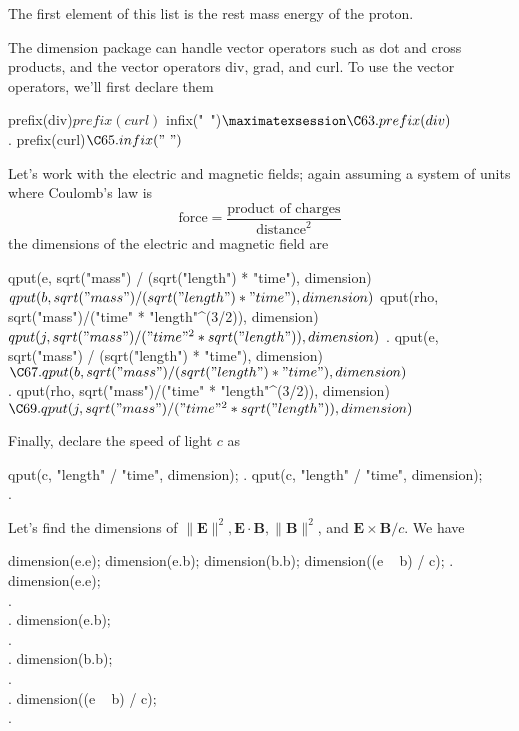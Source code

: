 \noindent The first element of this list is the rest mass energy of the 
proton.

The dimension package can handle vector operators such as
dot and cross products, and the vector operators div, grad, and curl.
To use the vector operators, we'll first declare them

\beginmaximasession
prefix(div)$
prefix(curl)$
infix("~")$
\maximatexsession
\C63.  prefix(div)$ \\
.  prefix(curl)$ \\
\C65.  infix("~")$ \\
\endmaximasession

\noindent Let's work with the electric and magnetic fields;
again assuming a system of units where Coulomb's law is
\[
  \mbox{force} = \frac{\mbox{product of charges}}{\mbox{distance}^2}
\]
the dimensions of the electric and magnetic field are

\beginmaximasession
qput(e, sqrt("mass") / (sqrt("length") * "time"), dimension)$
qput(b, sqrt("mass") / (sqrt("length") * "time"),dimension)$
qput(rho, sqrt("mass")/("time" * "length"^(3/2)), dimension)$
qput(j, sqrt("mass") / ("time"^2 * sqrt("length")), dimension)$
\maximatexsession
{}.  qput(e, sqrt("mass") / (sqrt("length") * "time"), dimension)$ \\
\C67.  qput(b, sqrt("mass") / (sqrt("length") * "time"),dimension)$ \\
.  qput(rho, sqrt("mass")/("time" * "length"^(3/2)), dimension)$ \\
\C69.  qput(j, sqrt("mass") / ("time"^2 * sqrt("length")), dimension)$ \\
\endmaximasession

Finally, declare the speed of light $c$ as

\beginmaximasession
qput(c, "length" / "time", dimension);
\maximatexsession
{}.  qput(c, "length" / "time", dimension); \\
.   \\
\endmaximasession

\noindent Let's find the dimensions of 
$\| \mathbf{E} \|^2, \mathbf{E} \cdot \mathbf{B},
\| \mathbf{B} \|^2$, and $\mathbf{E} \times \mathbf{B} / c$.  We have

\beginmaximasession
dimension(e.e);
dimension(e.b);
dimension(b.b);
dimension((e ~ b) / c);
\maximatexsession
{}.  dimension(e.e); \\
.   \\
.  dimension(e.b); \\
.   \\
.  dimension(b.b); \\
.   \\
.  dimension((e ~ b) / c); \\
.   \\
\endmaximasession

